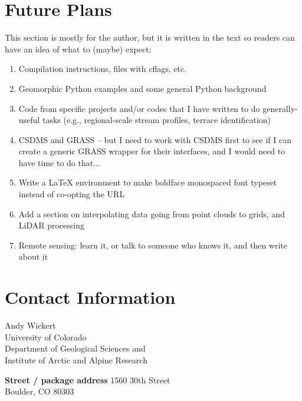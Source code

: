 \documentclass{book}
\begin{document}
\section{Future Plans}

This section is mostly for the author, but it is written in the text so readers can have an idea of what to (maybe) expect:

\begin{enumerate}
 \item Compilation instructions, files with cflags, etc.
 \item Geomorphic Python examples and some general Python background
 \item Code from specific projects and/or codes that I have written to do generally-useful tasks (e.g., regional-scale stream profiles, terrace identification)
 \item CSDMS and GRASS -- but I need to work with CSDMS first to see if I can create a generic GRASS wrapper for their interfaces, and I would need to have time to do that... 
 \item Write a LaTeX environment to make boldface monospaced font typeset instead of co-opting the URL 
 \item Add a section on interpolating data going from point clouds to grids, and LiDAR processing
 \item Remote sensing: learn it, or talk to someone who knows it, and then write about it
\end{enumerate}

\pagebreak

\section{Contact Information}

\begin{centering}
\noindent Andy Wickert\\
University of Colorado\\
Department of Geological Sciences and\\
Institute of Arctic and Alpine Research\\
\end{centering}
\vspace{12pt}

\begin{centering}
\textbf{Street / package address}
1560 30th Street\\
Boulder, CO 80303\\
\end{centering}
\vspace{12pt}
\end{document}
